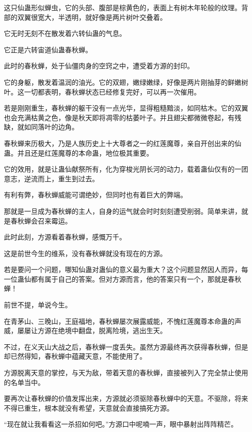 
\begin{this_body}

这只仙蛊形似蝉虫，它的头部、腹部是棕黄色的，表面上有树木年轮般的纹理。背部的双翼很宽大，半透明，就好像是两片树叶交叠着。

它无时无刻不在散发着六转仙蛊的气息。

它正是六转宙道仙蛊春秋蝉。

此时的春秋蝉，处于仙僵肉身的空窍之中，遭受着方源的封印。

它的身躯，散发着温润的油光。它的双翅，嫩绿嫩绿，好像是两片刚抽芽的鲜嫩树叶。这一切都表明，春秋蝉状态已经修复完好，可以再一次催用。

若是刚刚重生，春秋蝉的躯干没有一点光华，显得粗糙黯淡，如同枯木。它的双翼也会充满枯黄之色，像是秋天即将凋零的枯萎叶子。并且翅尖都微微卷起，有残缺，就如同落叶的边角。

春秋蝉来历极大，乃是人族历史上十大尊者之一的红莲魔尊，亲自开创出来的仙蛊。并且还是红莲魔尊的本命蛊，地位极其重要。

它的效用，就是让蛊仙献祭所有，化为穿梭光阴长河的动力，载着蛊仙仅有的一团意志，逆流而上，重生到过去。

有利有弊，春秋蝉威能可谓绝妙，但同时也有着巨大的弊端。

那就是一旦成为春秋蝉的主人，自身的运气就会时时刻刻遭受削弱。简单来讲，就是春秋蝉会召来霉运。

此时此刻，方源看着春秋蝉，感慨万千。

这是前世今生的维系，没有春秋蝉就没有现在的方源。

若是要问一个问题，哪知仙蛊对蛊仙的意义最为重大？这个问题显然因人而异，每一位蛊仙都有属于自己的答案。但对方源而言，他的答案只有一个，那就是春秋蝉！

前世不提，单说今生。

在青茅山、三晚山，王庭福地，春秋蝉屡次展露威能，不愧红莲魔尊本命蛊的声威，屡屡让方源在绝境中翻盘，脱离险境，逃出生天。

不过，在义天山大战之后，春秋蝉一度丢失。虽然方源最终再次获得春秋蝉，但是却已然得知，春秋蝉中蕴藏天意，不能使用了。

方源脱离天意的掌控，与天为敌，带着天意的春秋蝉，直接被列入了完全禁止使用的名单当中。

要再次让春秋蝉的价值发挥出来，方源就必须驱除春秋蝉中的天意。不驱除，将来不得已重生，根本就没有希望，天意就会直接搞死方源。

“现在就让我看看这一杀招如何吧。”方源口中呢喃一声，眼中暴射出阵阵精芒。


\end{this_body}
